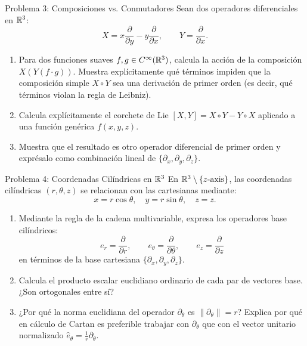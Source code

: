\documentclass[11pt,letterpaper]{article}
\begin{document}

\begin{infobox}{Problema 3: Composiciones vs. Conmutadores}
Sean dos operadores diferenciales en $\mathbb{R}^3$:
\[
X = x \frac{\partial}{\partial y} - y \frac{\partial}{\partial x}, \qquad Y = \frac{\partial}{\partial x}.
\]
\begin{enumerate}[label=\alph*)]
    \item Para dos funciones suaves $f, g \in C^\infty(\mathbb{R}^3)$, calcula la acción de la composición $X(Y(f \cdot g))$.
    Muestra explícitamente qué términos impiden que la composición simple $X \circ Y$ sea una derivación de primer orden (es decir, qué términos violan la regla de Leibniz).
    \item Calcula explícitamente el corchete de Lie $[X, Y] = X \circ Y - Y \circ X$ aplicado a una función genérica $f(x, y, z)$.
    \item Muestra que el resultado es otro operador diferencial de primer orden y exprésalo como combinación lineal de $\{\partial_x, \partial_y, \partial_z\}$.
\end{enumerate}
\end{infobox}

\begin{infobox}{Problema 4: Coordenadas Cilíndricas en $\mathbb{R}^3$}
En $\mathbb{R}^3 \setminus \{z\text{-axis}\}$, las coordenadas cilíndricas $(r, \theta, z)$ se relacionan con las cartesianas mediante:
\[
x = r\cos\theta, \quad y = r\sin\theta, \quad z = z.
\]
\begin{enumerate}[label=\alph*)]
    \item Mediante la regla de la cadena multivariable, expresa los operadores base cilíndricos:
    \[
    e_r = \frac{\partial}{\partial r}, \qquad e_\theta = \frac{\partial}{\partial \theta}, \qquad e_z = \frac{\partial}{\partial z}
    \]
    en términos de la base cartesiana $\{\partial_x, \partial_y, \partial_z\}$.
    \item Calcula el producto escalar euclidiano ordinario de cada par de vectores base. ¿Son ortogonales entre sí?
    \item ¿Por qué la norma euclidiana del operador $\partial_\theta$ es $\|\partial_\theta\| = r$? Explica por qué en cálculo de Cartan es preferible trabajar con $\partial_\theta$ que con el vector unitario normalizado $\hat{e}_\theta = \frac{1}{r}\partial_\theta$.
\end{enumerate}
\end{infobox}
\end{document}
